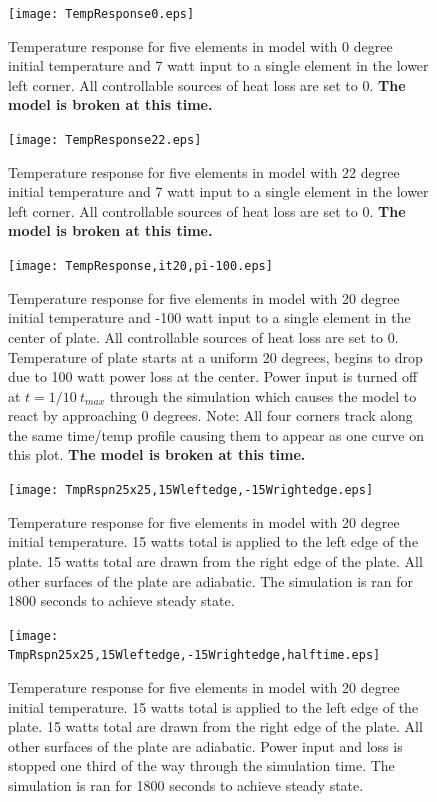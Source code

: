 \documentclass[10pt,twocolumn]{article}
\begin{document}
\begin{figure}
	\center
	\texttt{[image: TempResponse0.eps]}
	\caption{Temperature response for five elements in model with 0 degree initial temperature and 7 watt input to a single element in the lower left corner. All controllable sources of heat loss are set to 0. \textbf{The model is broken at this time.}}
	\label{fig:TempResponse0}
\end{figure}

\begin{figure}
	\center
	\texttt{[image: TempResponse22.eps]}
	\caption{Temperature response for five elements in model with 22 degree initial temperature and 7 watt input to a single element in the lower left corner. All controllable sources of heat loss are set to 0. \textbf{The model is broken at this time.}}
	\label{fig:TempRespsonse22}
\end{figure}

\begin{figure}
	\center
	\texttt{[image: TempResponse,it20,pi-100.eps]}
	\caption{Temperature response for five elements in model with 20 degree initial temperature and -100 watt input to a single element in the center of plate. All controllable sources of heat loss are set to 0. Temperature of plate starts at a uniform 20 degrees, begins to drop due to 100 watt power loss at the center. Power input is turned off at $t=1/10\ t_{max}$ through the simulation which causes the model to react by approaching 0 degrees. Note: All four corners track along the same time/temp profile causing them to appear as one curve on this plot. \textbf{The model is broken at this time.}}
	\label{fig:TempResponse,it20,pi-100}
\end{figure}

\begin{figure}
	\center
	\texttt{[image: TmpRspn25x25,15Wleftedge,-15Wrightedge.eps]}
	\caption{Temperature response for five elements in model with 20 degree initial temperature. 15 watts total is applied to the left edge of the plate. 15 watts total are drawn from the right edge of the plate. All other surfaces of the plate are adiabatic. The simulation is ran for 1800 seconds to achieve steady state.}
	\label{fig:TmpRspn25x25,15Wleftedge,-15Wrightedge}
\end{figure}

\begin{figure}
	\center
	\texttt{[image: TmpRspn25x25,15Wleftedge,-15Wrightedge,halftime.eps]}
	\caption{Temperature response for five elements in model with 20 degree initial temperature. 15 watts total is applied to the left edge of the plate. 15 watts total are drawn from the right edge of the plate. All other surfaces of the plate are adiabatic. Power input and loss is stopped one third of the way through the simulation time. The simulation is ran for 1800 seconds to achieve steady state.}
	\label{fig:TmpRspn25x25,15Wleftedge,-15Wrightedge,halftime}
\end{figure}
\end{document}

